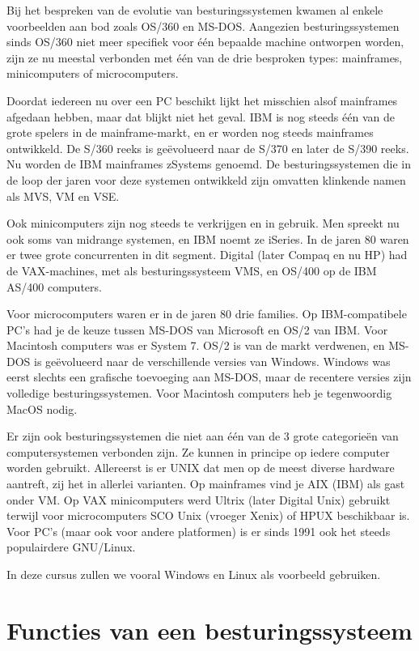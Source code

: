 Bij het bespreken van de evolutie van besturingssystemen kwamen al
enkele voorbeelden aan bod zoals OS/360 en MS-DOS. Aangezien
besturingssystemen sinds OS/360 niet meer specifiek voor \'e\'en bepaalde
machine ontworpen worden, zijn ze nu meestal verbonden met \'e\'en van de
drie besproken types: mainframes, minicomputers of
microcomputers.

Doordat iedereen nu over een PC beschikt lijkt het misschien alsof
mainframes afgedaan hebben, maar dat blijkt niet het geval. IBM is nog
steeds \'e\'en van de grote spelers in de mainframe-markt, en er worden nog
steeds mainframes ontwikkeld. De S/360 reeks is ge\"evolueerd naar de
S/370 en later de S/390 reeks. Nu worden de IBM mainframes zSystems
genoemd. De besturingssystemen die in de loop der jaren voor deze
systemen ontwikkeld zijn omvatten klinkende namen als MVS, VM en
VSE.

Ook minicomputers zijn nog steeds te verkrijgen en in gebruik. Men
spreekt nu ook soms van midrange systemen, en IBM noemt ze iSeries. In
de jaren 80 waren er twee grote concurrenten in dit segment. Digital
(later Compaq en nu HP) had de VAX-machines, met als besturingssysteem
VMS, en OS/400 op de IBM AS/400 computers.

Voor microcomputers waren er in de jaren 80 drie families. Op
IBM-compatibele PC's had je de keuze tussen MS-DOS van Microsoft en OS/2
van IBM. Voor Macintosh computers was er System 7. OS/2 is van de markt
verdwenen, en MS-DOS is ge\"evolueerd naar de verschillende versies van
Windows. Windows was eerst slechts een grafische toevoeging aan MS-DOS,
maar de recentere versies zijn volledige besturingssystemen. Voor
Macintosh computers heb je tegenwoordig MacOS nodig.

Er zijn ook besturingssystemen die niet aan \'e\'en van de 3 grote
categorie\"en van computersystemen verbonden zijn. Ze kunnen in principe
op iedere computer worden gebruikt. Allereerst is er UNIX dat men op de
meest diverse hardware aantreft, zij het in allerlei varianten. Op
mainframes vind je AIX (IBM) als gast onder VM. Op VAX minicomputers
werd Ultrix (later Digital Unix) gebruikt terwijl voor microcomputers
SCO Unix (vroeger Xenix) of HPUX beschikbaar is. Voor PC's (maar ook
voor andere platformen) is er sinds 1991 ook het steeds populairdere
GNU/Linux.

In deze cursus zullen we vooral Windows en Linux als voorbeeld
gebruiken.

\section{Functies van een besturingssysteem}

